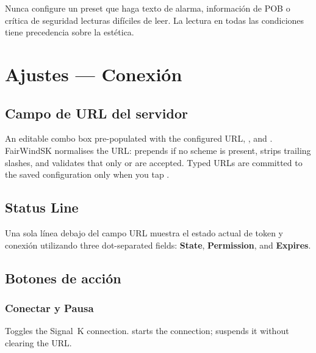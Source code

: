 \begin{warningbox}
Nunca configure un preset que haga texto de alarma, información de POB o crítica de seguridad
lecturas difíciles de leer.
La lectura en todas las condiciones tiene precedencia sobre la estética.
\end{warningbox}

\chapter{Ajustes --- Conexión}
\label{ch:settings-connection}


\section{Campo de URL del servidor}

An editable combo box pre-populated with the configured URL, ,
and .
FairWindSK normalises the URL: prepends  if no scheme is present,
strips trailing slashes, and validates that only  or  are accepted.
Typed URLs are committed to the saved configuration only when you tap .

\section{Status Line}

Una sola línea debajo del campo URL muestra el estado actual de token y conexión utilizando
three dot-separated fields: \textbf{State}, \textbf{Permission}, and \textbf{Expires}.

\section{Botones de acción}

\subsection{Conectar y Pausa}

Toggles the Signal~K connection.
 starts the connection;  suspends it without clearing the URL.

